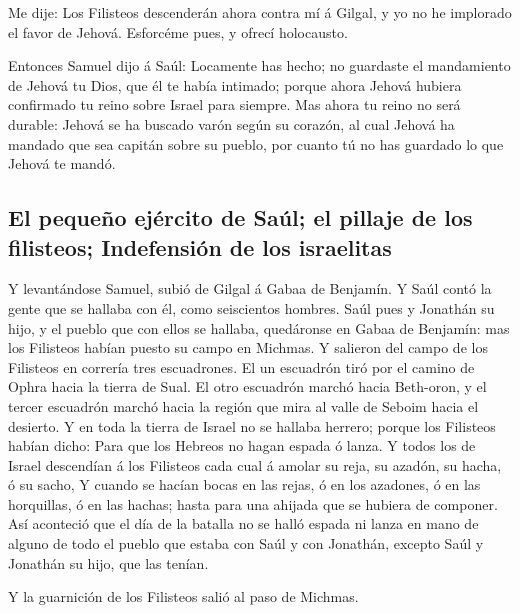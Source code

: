  Me dije: Los Filisteos descenderán ahora contra mí á
Gilgal, y yo no he implorado el favor de Jehová. Esforcéme pues, y
ofrecí holocausto.

 Entonces Samuel dijo á Saúl: Locamente has hecho; no
guardaste el mandamiento de Jehová tu Dios, que él te había intimado;
porque ahora Jehová hubiera confirmado tu reino sobre Israel para
siempre.  Mas ahora tu reino no será durable: Jehová se
ha buscado varón según su corazón, al cual Jehová ha mandado que sea
capitán sobre su pueblo, por cuanto tú no has guardado lo que Jehová te
mandó.

\hypertarget{el-pequeuxf1o-ejuxe9rcito-de-sauxfal-el-pillaje-de-los-filisteos-indefensiuxf3n-de-los-israelitas}{%
\subsection{El pequeño ejército de Saúl; el pillaje de los filisteos;
Indefensión de los
israelitas}\label{el-pequeuxf1o-ejuxe9rcito-de-sauxfal-el-pillaje-de-los-filisteos-indefensiuxf3n-de-los-israelitas}}

 Y levantándose Samuel, subió de Gilgal á Gabaa de
Benjamín. Y Saúl contó la gente que se hallaba con él, como seiscientos
hombres.  Saúl pues y Jonathán su hijo, y el pueblo que
con ellos se hallaba, quedáronse en Gabaa de Benjamín: mas los Filisteos
habían puesto su campo en Michmas.  Y salieron del campo
de los Filisteos en correría tres escuadrones. El un escuadrón tiró por
el camino de Ophra hacia la tierra de Sual.  El otro
escuadrón marchó hacia Beth-oron, y el tercer escuadrón marchó hacia la
región que mira al valle de Seboim hacia el desierto.  Y
en toda la tierra de Israel no se hallaba herrero; porque los Filisteos
habían dicho: Para que los Hebreos no hagan espada ó lanza.
 Y todos los de Israel descendían á los Filisteos cada
cual á amolar su reja, su azadón, su hacha, ó su sacho, 
Y cuando se hacían bocas en las rejas, ó en los azadones, ó en las
horquillas, ó en las hachas; hasta para una ahijada que se hubiera de
componer.  Así aconteció que el día de la batalla no se
halló espada ni lanza en mano de alguno de todo el pueblo que estaba con
Saúl y con Jonathán, excepto Saúl y Jonathán su hijo, que las tenían.

 Y la guarnición de los Filisteos salió al paso de
Michmas.


